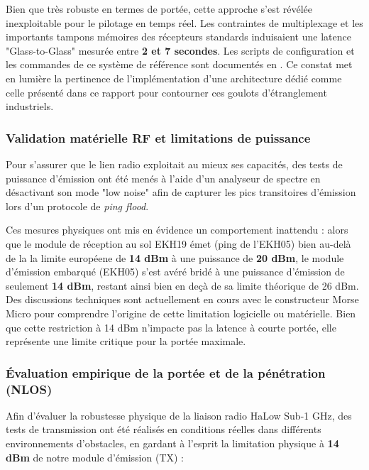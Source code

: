 Bien que très robuste en termes de portée, cette approche s'est révélée inexploitable pour le pilotage en temps réel. Les contraintes de multiplexage 
et les importants tampons mémoires des récepteurs standards induisaient une latence "Glass-to-Glass" mesurée entre \textbf{2 et 7 secondes}. Les 
scripts de configuration et les commandes de ce système de référence sont documentés en . Ce constat met en lumière la 
pertinence de l'implémentation d'une architecture dédié comme celle présenté dans ce rapport pour contourner ces goulots d'étranglement industriels.

\subsubsection{Validation matérielle RF et limitations de puissance}
Pour s'assurer que le lien radio exploitait au mieux ses capacités, des tests de puissance d'émission ont été menés à l'aide d'un analyseur de 
spectre en désactivant son mode "low noise" afin de capturer les pics transitoires d'émission lors d'un protocole de \textit{ping flood}. 

Ces mesures physiques ont mis en évidence un comportement inattendu : alors que le module de réception au sol EKH19 émet (ping de l'EKH05) bien au-delà de la
la limite européene de \textbf{14 dBm} à une puissance de \textbf{20 dBm}, le module d'émission embarqué (EKH05) s'est avéré bridé à une puissance d'émission de seulement 
\textbf{14 dBm}, restant ainsi bien en deçà de sa limite théorique de 26 dBm. Des discussions techniques sont actuellement en cours avec le 
constructeur Morse Micro pour comprendre l'origine de cette limitation logicielle ou matérielle. Bien que cette restriction à 14 dBm 
n'impacte pas la latence à courte portée, elle représente une limite critique pour la portée maximale.

\subsubsection{Évaluation empirique de la portée et de la pénétration (NLOS)}
Afin d'évaluer la robustesse physique de la liaison radio HaLow Sub-1 GHz, des tests de transmission ont été 
réalisés en conditions réelles dans différents environnements d'obstacles, en gardant à l'esprit la limitation physique 
à \textbf{14 dBm} de notre module d'émission (TX) :

